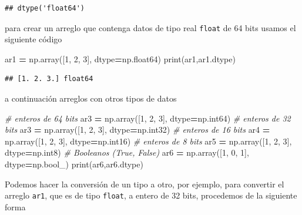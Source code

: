 \documentclass[
]{book}
\newenvironment{Shaded}{\begin{snugshade}}{\end{snugshade}}
\newcommand{\BuiltInTok}[1]{#1}
\newcommand{\CommentTok}[1]{\textcolor[rgb]{0.56,0.35,0.01}{\textit{#1}}}
\newcommand{\DecValTok}[1]{\textcolor[rgb]{0.00,0.00,0.81}{#1}}
\newcommand{\NormalTok}[1]{#1}
\newcommand{\OperatorTok}[1]{\textcolor[rgb]{0.81,0.36,0.00}{\textbf{#1}}}
\theoremstyle{definition}
\theoremstyle{definition}
\theoremstyle{definition}
\theoremstyle{definition}
\theoremstyle{remark}
\begin{document}
\begin{verbatim}
## dtype('float64')
\end{verbatim}

para crear un arreglo que contenga datos de tipo real \texttt{float} de 64 bits usamos el siguiente código

\begin{Shaded}
\begin{Highlighting}[]
\NormalTok{ar1 }\OperatorTok{=}\NormalTok{ np.array([}\DecValTok{1}\NormalTok{, }\DecValTok{2}\NormalTok{, }\DecValTok{3}\NormalTok{], dtype}\OperatorTok{=}\NormalTok{np.float64)}
\BuiltInTok{print}\NormalTok{(ar1,ar1.dtype) }
\end{Highlighting}
\end{Shaded}

\begin{verbatim}
## [1. 2. 3.] float64
\end{verbatim}

a continuación arreglos con otros tipos de datos

\begin{Shaded}
\begin{Highlighting}[]
\CommentTok{\# enteros de 64 bits }
\NormalTok{ar3 }\OperatorTok{=}\NormalTok{ np.array([}\DecValTok{1}\NormalTok{, }\DecValTok{2}\NormalTok{, }\DecValTok{3}\NormalTok{], dtype}\OperatorTok{=}\NormalTok{np.int64) }
\CommentTok{\# enteros de 32 bits }
\NormalTok{ar3 }\OperatorTok{=}\NormalTok{ np.array([}\DecValTok{1}\NormalTok{, }\DecValTok{2}\NormalTok{, }\DecValTok{3}\NormalTok{], dtype}\OperatorTok{=}\NormalTok{np.int32) }
\CommentTok{\# enteros de 16 bits }
\NormalTok{ar4 }\OperatorTok{=}\NormalTok{ np.array([}\DecValTok{1}\NormalTok{, }\DecValTok{2}\NormalTok{, }\DecValTok{3}\NormalTok{], dtype}\OperatorTok{=}\NormalTok{np.int16)}
\CommentTok{\# enteros de 8 bits }
\NormalTok{ar5 }\OperatorTok{=}\NormalTok{ np.array([}\DecValTok{1}\NormalTok{, }\DecValTok{2}\NormalTok{, }\DecValTok{3}\NormalTok{], dtype}\OperatorTok{=}\NormalTok{np.int8) }
\CommentTok{\# Booleanos (True, False) }
\NormalTok{ar6 }\OperatorTok{=}\NormalTok{ np.array([}\DecValTok{1}\NormalTok{, }\DecValTok{0}\NormalTok{, }\DecValTok{1}\NormalTok{], dtype}\OperatorTok{=}\NormalTok{np.bool\_)}
\BuiltInTok{print}\NormalTok{(ar6,ar6.dtype)}
\end{Highlighting}
\end{Shaded}

Podemos hacer la conversión de un tipo a otro, por ejemplo, para convertir el arreglo \texttt{ar1}, que es de tipo \texttt{float}, a entero de 32 bits, procedemos de la siguiente forma
\end{document}
